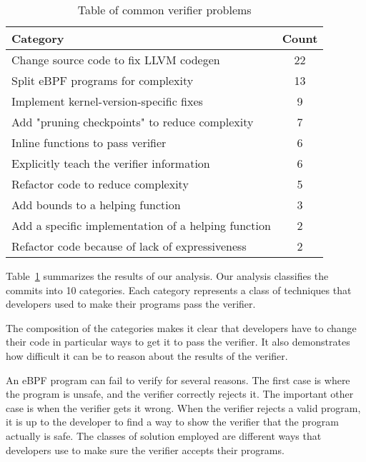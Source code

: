 \begin{table}[t]
    \small
    \centering
    \begin{tabular}{lc}%
        \toprule
        \textbf{Category} & \textbf{Count} \\
        \midrule
        Change source code to fix LLVM codegen & 22 \\
        Split eBPF programs for complexity & 13 \\
        Implement kernel-version-specific fixes & 9 \\
        Add "pruning checkpoints" to reduce complexity & 7 \\
        Inline functions to pass verifier & 6 \\
        Explicitly teach the verifier information & 6 \\
        Refactor code to reduce complexity & 5 \\
        Add bounds to a helping function & 3 \\
        Add a specific implementation of a helping function & 2 \\
        Refactor code because of lack of expressiveness & 2 \\
        \bottomrule
    \end{tabular}
    \caption{Table of common verifier problems}
    \label{fig:commit-table}
\end{table}

Table~\ref{fig:commit-table} summarizes the results of our analysis.
Our analysis classifies the commits into 10 categories.
Each category represents a class of techniques that developers used to make their programs pass the verifier.


The composition of the categories makes it clear that developers have to change their code in particular ways to get it to pass the verifier.
It also demonstrates how difficult it can be to reason about the results of the verifier.

An eBPF program can fail to verify for several reasons.
The first case is where the program is unsafe, and the verifier correctly rejects it.
The important other case is when the verifier gets it wrong.
When the verifier rejects a valid program, it is up to the developer to find a way to show the verifier that the program actually is safe.
The classes of solution employed are different ways that developers use to make sure the verifier accepts their programs.

